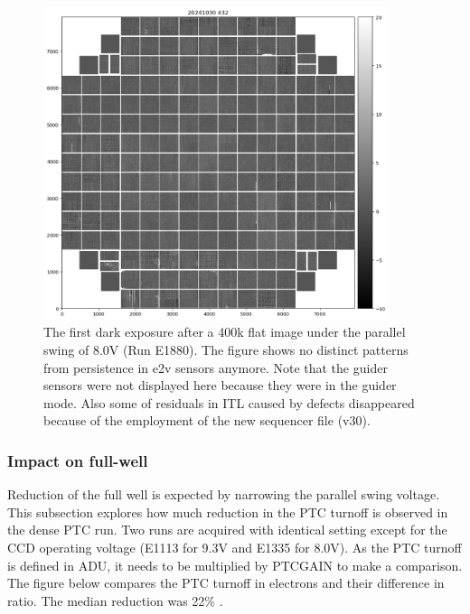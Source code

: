 \begin{figure}
\begin{centering}
\includegraphics[width=0.9\textwidth]{sections/figures/E1880dp80.png}
\end{centering}
\caption{The first dark exposure after a 400k flat image under the
parallel swing of 8.0V (Run E1880). The figure shows no distinct
patterns from persistence in e2v sensors anymore. Note that the guider
sensors were not displayed here because they were in the guider mode.
Also some of residuals in ITL caused by defects disappeared because of
the employment of the new sequencer file (v30).}
\end{figure}

\subsubsection{Impact on full-well}\label{impact-on-full-well}

Reduction of the full well is expected by narrowing the parallel swing
voltage. This subsection explores how much reduction in the PTC turnoff
is observed in the dense PTC run. Two runs are acquired with identical
setting except for the CCD operating voltage (E1113 for 9.3V and E1335
for 8.0V). As the PTC turnoff is defined in ADU, it needs to be
multiplied by PTC\label{gain}{GAIN} to make a comparison.
The figure below compares the PTC turnoff in electrons and their
difference in ratio. The median reduction was 22\% .

